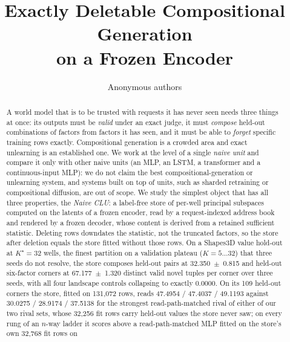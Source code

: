 \documentclass{article} %
\title{Exactly Deletable Compositional Generation\\ on a Frozen Encoder}
\author{Anonymous authors}
\newcommand{\Kstar}{\ensuremath{K^{\star}}}
\begin{document}
\maketitle

\begin{abstract}
A world model that is to be trusted with requests it has never seen needs three things at
once: its outputs must be \emph{valid} under an exact judge, it must \emph{compose}
held-out combinations of factors from factors it has seen, and it must be able to
\emph{forget} specific training rows exactly. Compositional generation is a crowded area
and exact unlearning is an established one. We work at the level of a single \emph{naive unit} and
compare it only with other naive units (an MLP, an LSTM, a transformer and a continuous-input MLP):
we do not claim the best compositional-generation or unlearning system, and systems built on top of
units, such as sharded retraining or compositional diffusion, are out of scope.
We study the simplest object that has all three properties, the \emph{Naive CLU}: a
label-free store of per-well principal subspaces computed on the latents of a frozen
encoder, read by a request-indexed address book and rendered by a frozen decoder, whose
content is derived from a retained sufficient statistic. Deleting rows downdates the
statistic, not the truncated factors, so the store after deletion equals the store fitted
without those rows. On a Shapes3D value hold-out at $\Kstar=32$ wells, the finest partition on a validation plateau
($K=5\ldots32$) that three seeds do not resolve, %
the store composes held-out pairs at 32.350~$\pm$~0.815 and held-out six-factor corners at
67.177~$\pm$~1.320 distinct valid novel tuples per corner over three seeds, with all four landscape
controls collapsing to exactly 0.0000. %
On its 109 held-out corners the store, fitted on 131,072 rows, reads 47.4954 / 47.4037 / 49.1193 %
against 30.0275 / 28.9174 / 37.5138 for the strongest read-path-matched rival of either of our two %
rival sets, whose 32,256 fit rows carry held-out values the store never saw; on every rung of an %
$n$-way ladder it scores above a read-path-matched MLP fitted on the store's own 32,768 fit rows on %

\end{abstract}
\end{document}
